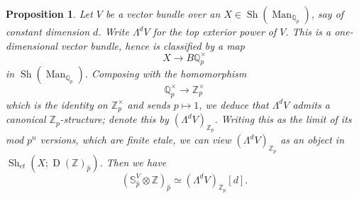 \documentclass[12pt]{article}
\newtheorem{proposition}[theorem]{Proposition}
\newcommand{\on}{\operatorname}
\newcommand{\mbb}{\mathbb}
\newcommand{\wh}{\widehat}
\begin{document}
\begin{proposition}\label{classicaltwists}
Let $V$ be a vector bundle over an $X\in\on{Sh}(\on{Man}_{\mbb{Q}_p})$, say of constant dimension $d$.  Write $\Lambda^d V$ for the top exterior power of $V$.  This is a one-dimensional vector bundle, hence is classified by a map
$$X\to B\mathbb{Q}_p^\times$$
in $\on{Sh}(\on{Man}_{\mbb{Q}_p})$.  Composing with the homomorphism
$$\mbb{Q}_p^\times \to \mbb{Z}_p^\times$$
which is the identity on $\mbb{Z}_p^\times$ and sends $p\mapsto 1$, we deduce that $\Lambda^d V$ admits a canonical $\mbb{Z}_p$-structure; denote this by $(\Lambda^d V)_{\mbb{Z}_p}$.  Writing this as the limit of its mod $p^n$ versions, which are finite etale, we can view $(\Lambda^d V)_{\mbb{Z}_p}$ as an object in $\on{Sh}_{et}(X;\on{D}(\mbb{Z})_{\wh{p}})$.  Then we have
$$(\mbb{S}_{\wh{p}}^V\otimes \mathbb{Z})_{\wh{p}}\simeq (\Lambda^d V)_{\mbb{Z}_p}[d].$$
\end{proposition}
\end{document}
